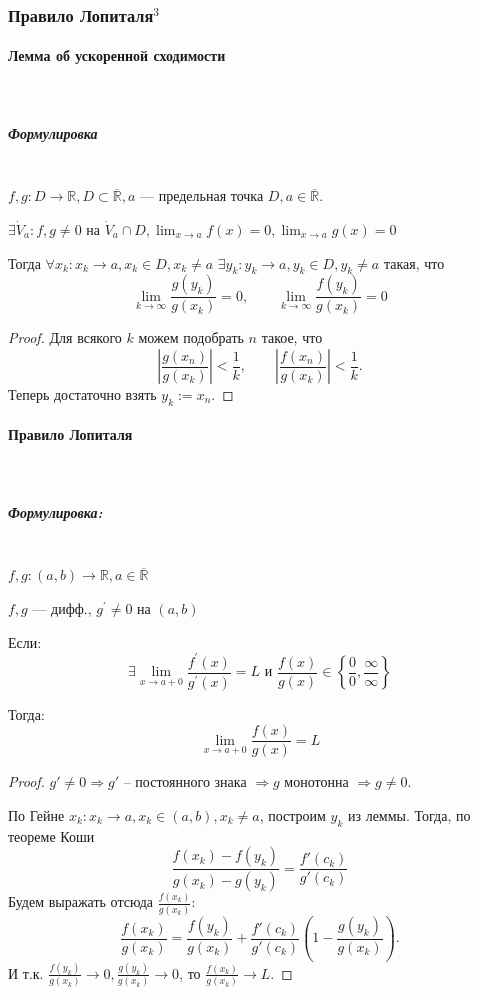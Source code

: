 \documentclass{article}
\let\vanillaparagraph\paragraph
\let\vanillasubparagraph\subparagraph
\renewcommand{\paragraph}[1]{\vanillaparagraph{#1}\mbox{}\\}
\renewcommand{\subparagraph}[1]{\vanillasubparagraph{#1}\mbox{}\\}
\begin{document}
\subsubsection{Правило Лопиталя\texorpdfstring{$^3$}{}}

\paragraph{Лемма об ускоренной сходимости}
\subparagraph{Формулировка}

$f, g: D \rightarrow \mathbb{R}, D \subset \overline{\mathbb{R}}, a$ --- предельная точка $D, a \in \overline{\mathbb{R}}$.

$\exists \dot{V}_a : f, g \neq 0$ на $\dot{V}_a \cap D, \lim_{x \rightarrow a}{f(x)} = 0, \lim_{x \rightarrow a}{g(x)} = 0$

Тогда $\forall x_k: x_k\to a, x_k \in D, x_k \neq a$ $\exists y_k: y_k\to a, y_k \in D, y_k \neq a$ такая, что
\begin{equation*}
\lim_{k\to \infty} \frac{g(y_k)}{g(x_k)} = 0, \qquad \lim_{k\to \infty} \frac{f(y_k)} {g(x_k)} = 0
\end{equation*}

\begin{proof}
Для всякого $k$ можем подобрать $n$ такое, что
\begin{equation*}
\left|\frac{g(x_n)} {g(x_k)}\right| < \frac{1} {k}, \qquad \left|\frac{f(x_n)}{g(x_k)}\right| < \frac{1} {k}.
\end{equation*}
Теперь достаточно взять  $y_k := x_n$.
\end{proof}

\paragraph{Правило Лопиталя}
\subparagraph{Формулировка:}

$f, g: (a, b) \rightarrow \mathbb{R}, a \in \overline{\mathbb{R}}$

$f, g$ --- дифф., $g^\prime \neq 0$ на $(a, b)$

Если:
\[\exists \lim_{x \rightarrow a + 0}{\frac{f^\prime(x)}{g^\prime(x)}} = L \text{ и } \frac{f(x)}{g(x)} \in \left\{\frac{0}{0}, \frac{\infty}{\infty}\right\}\]

Тогда: 
\[\lim_{x \rightarrow a + 0}{\frac{f(x)}{g(x)}} = L\]

\begin{proof}
$g' \neq 0 \Rightarrow g' $ -- постоянного знака $\Rightarrow g$ монотонна $\Rightarrow g \neq 0$. 

По Гейне $x_k: x_k \to a, x_k \in (a, b), x_k \neq a$, построим $y_k$ из леммы. Тогда, по теореме Коши 
\begin{equation*}
\frac{f(x_k) - f(y_k)} {g(x_k) - g(y_k)} = \frac{f'(c_k)} {g'(c_k)}
\end{equation*}
Будем выражать отсюда $\frac{f(x_k)} {g(x_k)}$:
\begin{equation*}
\frac{f(x_k)} {g(x_k)} = \frac{f(y_k)} {g(x_k)} + \frac{f'(c_k)} {g'(c_k)} \left(1 - \frac{g(y_k)}{g(x_k)}\right).
\end{equation*}
И т.к. $\frac{f(y_k)} {g(x_k)} \to 0, \frac{g(y_k)}{g(x_k)} \to 0$, то $\frac{f(x_k)} {g(x_k)} \to L$.
\end{proof}
\end{document}
